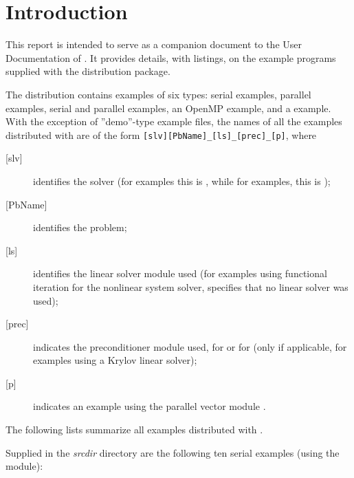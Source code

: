 \section{Introduction}\label{s:ex_intro}

This report is intended to serve as a companion document to the User
Documentation of {\cvode} \cite{cvode_ug}.  It provides details, with
listings, on the example programs supplied with the {\cvode} distribution
package.

The {\cvode} distribution contains examples of six types: serial
{\CC} examples, parallel {\CC} examples, serial and parallel {\F}
examples, an OpenMP example, and a {\hypre} example.
With the exception of ''demo''-type example files, the names of all the examples 
distributed with {\sundials} are of the form \verb![slv][PbName]_[ls]_[prec]_[p]!, 
where
\begin{description}
\item [{[slv]}] identifies the solver (for {\cvode} examples this is , 
  while for {\fcvode} examples, this is );
\item [{[PbName]}] identifies the problem;
\item [{[ls]}] identifies the linear solver module used (for examples using
  functional iteration for the nonlinear system solver,  specifies
  that no linear solver was used);
\item [{[prec]}] indicates the {\cvode} preconditioner module used,  for {\cvbandpre}
  or  for {\cvbbdpre} 
  (only if applicable, for examples using a Krylov linear solver);
\item [{[p]}] indicates an example using the parallel vector module {\nvecp}.
\end{description}

\vspace{0.2in}\noindent
The following lists summarize all examples distributed with {\cvode}.

\vspace{0.2in}\noindent
Supplied in the {\em srcdir} directory are the
following ten serial examples (using the {\nvecs} module):

